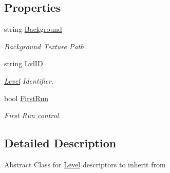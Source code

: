 \subsection*{Properties}
\begin{DoxyCompactItemize}
\item 
\mbox{\label{class_g_m_t_b_1_1_abstracts_1_1_level_a439001226a15ab69595def2ee288f3ce}} 
string \mbox{\hyperlink{class_g_m_t_b_1_1_abstracts_1_1_level_a439001226a15ab69595def2ee288f3ce}{Background}}
\begin{DoxyCompactList}\small\item\em Background Texture Path. \end{DoxyCompactList}\item 
\mbox{\label{class_g_m_t_b_1_1_abstracts_1_1_level_adbba7ac00e5ff29172bc648ab6b37f2c}} 
string \mbox{\hyperlink{class_g_m_t_b_1_1_abstracts_1_1_level_adbba7ac00e5ff29172bc648ab6b37f2c}{Lvl\+ID}}
\begin{DoxyCompactList}\small\item\em \mbox{\hyperlink{class_g_m_t_b_1_1_abstracts_1_1_level}{Level}} Identifier. \end{DoxyCompactList}\item 
\mbox{\label{class_g_m_t_b_1_1_abstracts_1_1_level_a270766fed7ba35f331507d1e2ce61e40}} 
bool \mbox{\hyperlink{class_g_m_t_b_1_1_abstracts_1_1_level_a270766fed7ba35f331507d1e2ce61e40}{First\+Run}}
\begin{DoxyCompactList}\small\item\em First Run control. \end{DoxyCompactList}\end{DoxyCompactItemize}


\subsection{Detailed Description}
Abstract Class for \mbox{\hyperlink{class_g_m_t_b_1_1_abstracts_1_1_level}{Level}} descriptors to inherit from 



